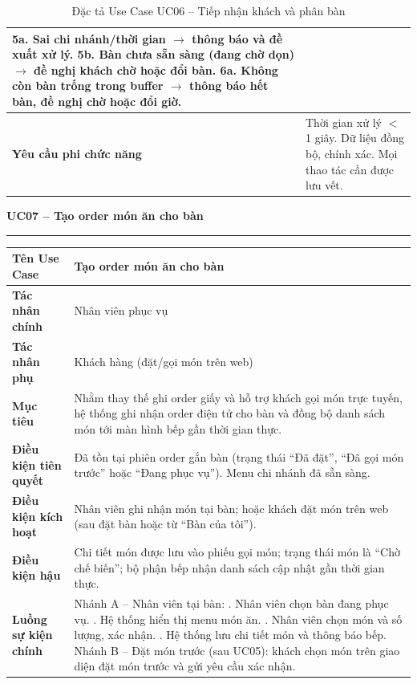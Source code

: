 ﻿\documentclass[../DoAn.tex]{subfiles}
\newcommand{\UCtitle}[1]{%
    \vspace{0.5em}
    {\large\bfseries #1}\\[-0.5em]
    \rule{\textwidth}{0.5pt}
    \vspace{0.3em}
}
\begin{document}
\begin{table}[H]
\begin{tabular}{|p{3.5cm}|p{10.7cm}|}
5a. Sai chi nhánh/thời gian $\rightarrow$ thông báo và đề xuất xử lý. \newline
5b. Bàn chưa sẵn sàng (đang chờ dọn) $\rightarrow$ đề nghị khách chờ hoặc đổi bàn. \newline
6a. Không còn bàn trống trong buffer $\rightarrow$ thông báo hết bàn, đề nghị chờ hoặc đổi giờ.
\\ \hline
\textbf{Yêu cầu phi chức năng} &
Thời gian xử lý $<$ 1 giây. Dữ liệu đồng bộ, chính xác. Mọi thao tác cần được lưu vết.
\\ \hline
\end{tabular}
\caption{Đặc tả Use Case UC06 – Tiếp nhận khách và phân bàn}
\end{table}

\begin{table}[H]
\UCtitle{UC07 – Tạo order món ăn cho bàn}
\centering
\begin{tabular}{|p{4cm}|p{10.2cm}|}
\hline
\textbf{Tên Use Case} & Tạo order món ăn cho bàn \\ \hline
\textbf{Tác nhân chính} & Nhân viên phục vụ \\ \hline
\textbf{Tác nhân phụ} & Khách hàng (đặt/gọi món trên web) \\ \hline
\textbf{Mục tiêu} &
Nhằm thay thế ghi order giấy và hỗ trợ khách gọi món trực tuyến, hệ thống ghi nhận order điện tử cho bàn và đồng bộ danh sách món tới màn hình bếp gần thời gian thực.
\\ \hline
\textbf{Điều kiện tiên quyết} &
Đã tồn tại phiên order gắn bàn (trạng thái ``Đã đặt'', ``Đã gọi món trước'' hoặc ``Đang phục vụ''). Menu chi nhánh đã sẵn sàng.
\\ \hline
\textbf{Điều kiện kích hoạt} &
Nhân viên ghi nhận món tại bàn; hoặc khách đặt món trên web (sau đặt bàn hoặc từ ``Bàn của tôi'').
\\ \hline
\textbf{Điều kiện hậu} &
Chi tiết món được lưu vào phiếu gọi món; trạng thái món là ``Chờ chế biến''; bộ phận bếp nhận danh sách cập nhật gần thời gian thực.
\\ \hline
\textbf{Luồng sự kiện chính} &
Nhánh A -- Nhân viên tại bàn: \newline
1. Nhân viên chọn bàn đang phục vụ. \newline
2. Hệ thống hiển thị menu món ăn. \newline
3. Nhân viên chọn món và số lượng, xác nhận. \newline
4. Hệ thống lưu chi tiết món và thông báo bếp. \newline
Nhánh B -- Đặt món trước (sau UC05): khách chọn món trên giao diện đặt món trước và gửi yêu cầu xác nhận. \newline

\end{tabular}
\end{table}
\end{document}
